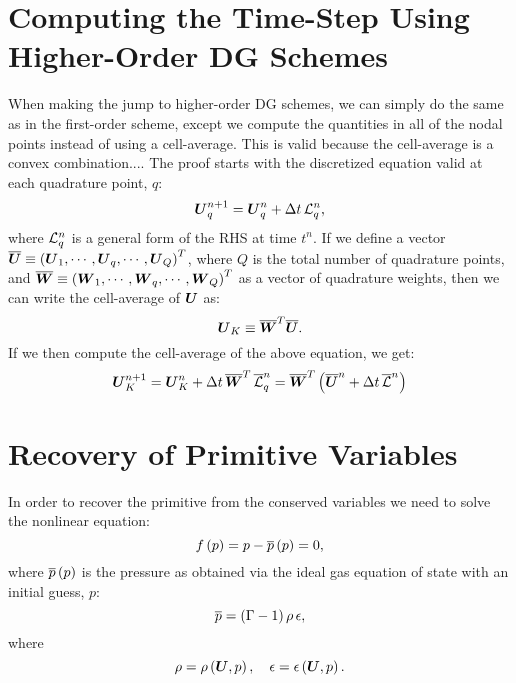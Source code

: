 \documentclass[10pt,preprint]{aastex}
\begin{document}
\section{Computing the Time-Step Using Higher-Order DG Schemes}

When making the jump to higher-order DG schemes, we can simply do the same as in the first-order scheme, except we compute the quantities in all of the nodal points instead of using a cell-average. This is valid because the cell-average is a convex combination.... The proof starts with the discretized equation valid at each quadrature point, $q$:
\begin{equation}
    \boldsymbol{U}_{q}^{n+1}=\boldsymbol{U}_{q}^{n}+\Delta t\,\mathcal{L}_{q}^{n},
\end{equation}
where $\mathcal{L}_{q}^{n}$ is a general form of the RHS at time $t^{n}$. If we define a vector $\overline{\boldsymbol{U}}\equiv\left(\boldsymbol{U}_{1},\cdots,\boldsymbol{U}_{q},\cdots,\boldsymbol{U}_{Q}\right)^T$, where $Q$ is the total number of quadrature points, and $\overline{\boldsymbol{W}}\equiv\left(\boldsymbol{W}_{1},\cdots,\boldsymbol{W}_{q},\cdots,\boldsymbol{W}_{Q}\right)^T$ as a vector of quadrature weights, then we can write the cell-average of $\boldsymbol{U}$ as:
\begin{equation}
    \boldsymbol{U}_{K}\equiv\overline{\boldsymbol{W}}^T\overline{\boldsymbol{U}}.
\end{equation}
If we then compute the cell-average of the above equation, we get:
\begin{equation}
    \boldsymbol{U}_{K}^{n+1}=\boldsymbol{U}_{K}^{n}+\Delta t\,\overline{\boldsymbol{W}}^{T}\,\overline{\mathcal{L}}_{q}^{n}=\overline{\boldsymbol{W}}^{T}\left(\overline{\boldsymbol{U}}^{n}+\Delta t\,\overline{\mathcal{L}}^{n}\right)
\end{equation}

\newpage
\section{Recovery of Primitive Variables}
In order to recover the primitive from the conserved variables we need to solve the nonlinear equation:
\begin{equation}
    f\left(p\right)=p-\overline{p}\left(p\right)=0,
\end{equation}
where $\overline{p}\left(p\right)$ is the pressure as obtained via the ideal gas equation of state with an initial guess, $p$:
\begin{equation}
    \overline{p}=\left(\Gamma-1\right)\rho\,\epsilon,
\end{equation}
where
\begin{equation}
    \rho=\rho\left(\boldsymbol{U},p\right),\hspace{1em}\epsilon=\epsilon\left(\boldsymbol{U},p\right).
\end{equation}
\end{document}
